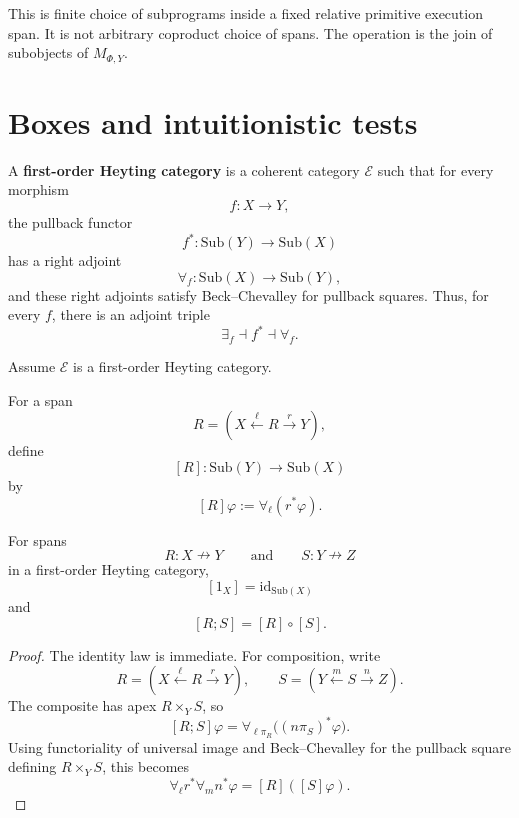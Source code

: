 \begin{remark}
\label{rem:relative-choice-not-arbitrary-coproduct}
This is finite choice of subprograms inside a fixed relative primitive
execution span. It is not arbitrary coproduct choice of spans. The operation is
the join of subobjects of \(M_{\Phi,Y}\).
\end{remark}

\section{Boxes and intuitionistic tests}
\label{sec:relative-boxes}

\begin{definition}
\label{def:first-order-heyting-relative}
A \textbf{first-order Heyting category} is a coherent category \(\mathcal E\)
such that for every morphism
\[
f:X\to Y,
\]
the pullback functor
\[
f^\ast:\mathrm{Sub}(Y)\to\mathrm{Sub}(X)
\]
has a right adjoint
\[
\forall_f:\mathrm{Sub}(X)\to\mathrm{Sub}(Y),
\]
and these right adjoints satisfy Beck--Chevalley for pullback squares.
Thus, for every \(f\), there is an adjoint triple
\[
\exists_f\dashv f^\ast\dashv \forall_f.
\]
\end{definition}

Assume \(\mathcal E\) is a first-order Heyting category.

\begin{definition}
\label{def:span-box-relative}
For a span
\[
R=
\left(
X\xleftarrow{\ell}R\xrightarrow{r}Y
\right),
\]
define
\[
[R]:\mathrm{Sub}(Y)\to\mathrm{Sub}(X)
\]
by
\[
[R]\varphi:=\forall_\ell(r^\ast\varphi).
\]
\end{definition}

\begin{proposition}
\label{prop:box-functoriality-relative}
For spans
\[
R:X\nrightarrow Y
\qquad\text{and}\qquad
S:Y\nrightarrow Z
\]
in a first-order Heyting category,
\[
[1_X]=\mathrm{id}_{\mathrm{Sub}(X)}
\]
and
\[
[R;S]=[R]\circ[S].
\]
\end{proposition}

\begin{proof}
The identity law is immediate. For composition, write
\[
R=(X\xleftarrow{\ell}R\xrightarrow{r}Y),
\qquad
S=(Y\xleftarrow{m}S\xrightarrow{n}Z).
\]
The composite has apex \(R\times_Y S\), so
\[
[R;S]\varphi
=
\forall_{\ell\pi_R}\bigl((n\pi_S)^\ast\varphi\bigr).
\]
Using functoriality of universal image and Beck--Chevalley for the pullback
square defining \(R\times_Y S\), this becomes
\[
\forall_\ell r^\ast\forall_m n^\ast\varphi
=
[R]([S]\varphi).
\]
\end{proof}

